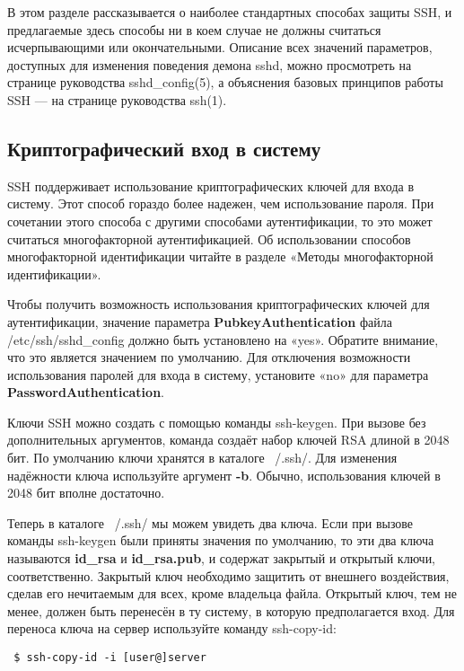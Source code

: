 \documentclass[a4paper,10pt,twoside]{article}
\begin{document}
В этом разделе рассказывается о наиболее стандартных способах защиты SSH, и предлагаемые здесь способы ни в коем случае не должны считаться исчерпывающими или окончательными. Описание всех значений параметров, доступных для изменения поведения демона sshd, можно просмотреть на странице руководства sshd\_config(5), а объяснения базовых принципов работы SSH — на странице руководства ssh(1).

\subsection{Криптографический вход в систему}
SSH поддерживает использование криптографических ключей для входа в систему. Этот способ гораздо более надежен, чем использование пароля. При сочетании этого способа с другими способами аутентификации, то это может считаться многофакторной аутентификацией. Об использовании способов многофакторной идентификации читайте в разделе «Методы многофакторной идентификации».

Чтобы получить возможность использования криптографических ключей для аутентификации, значение параметра \textbf{PubkeyAuthentication} файла /etc/ssh/sshd\_config должно быть установлено на «yes». Обратите внимание, что это является значением по умолчанию. Для отключения возможности использования паролей для входа в систему, установите «no» для параметра \textbf{PasswordAuthentication}.

Ключи SSH можно создать с помощью команды ssh-keygen. При вызове без дополнительных аргументов, команда создаёт набор ключей RSA длиной в 2048 бит. По умолчанию ключи хранятся в каталоге ~/.ssh/. Для изменения надёжности ключа используйте аргумент \textbf{-b}. Обычно, использования ключей в 2048 бит вполне достаточно.  

Теперь в каталоге ~/.ssh/ мы можем увидеть два ключа. Если при вызове команды ssh-keygen были приняты значения по умолчанию, то эти два ключа называются \textbf{id\_rsa} и \textbf{id\_rsa.pub}, и содержат закрытый и открытый ключи, соответственно. Закрытый ключ необходимо защитить от внешнего воздействия, сделав его нечитаемым для всех, кроме владельца файла. Открытый ключ, тем не менее, должен быть перенесён в ту систему, в которую предполагается вход. Для переноса ключа на сервер используйте команду ssh-copy-id:

\begin{verbatim}
 $ ssh-copy-id -i [user@]server
\end{verbatim} 
\end{document}
